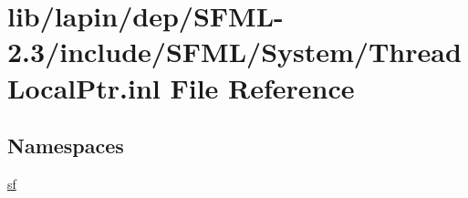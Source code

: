 \hypertarget{lapin_2dep_2_s_f_m_l-2_83_2include_2_s_f_m_l_2_system_2_thread_local_ptr_8inl}{\section{lib/lapin/dep/\-S\-F\-M\-L-\/2.3/include/\-S\-F\-M\-L/\-System/\-Thread\-Local\-Ptr.inl File Reference}
\label{lapin_2dep_2_s_f_m_l-2_83_2include_2_s_f_m_l_2_system_2_thread_local_ptr_8inl}
}
\subsection*{Namespaces}
\begin{DoxyCompactItemize}
\item 
\hyperlink{namespacesf}{sf}
\end{DoxyCompactItemize}
